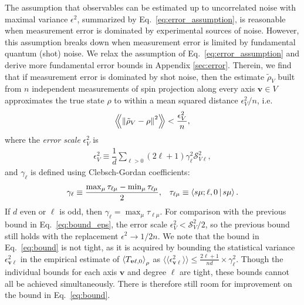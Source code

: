 \documentclass[notitlepage,twocolumn]{revtex4-2}
\newcommand{\f}[2]{\dfrac{#1}{#2}} %
\newcommand{\p}[1]{\left(#1\right)} %
\newcommand{\bk}{\Braket} %
\renewcommand{\v}{\bm} %
\newcommand{\bbk}[1]{\langle\!\langle #1 \rangle\!\rangle}
\newcommand{\Bbk}[1]
{\left\langle\!\!\left\langle #1 \right\rangle\!\!\right\rangle}
\renewcommand{\S}{\mathcal{S}}
\begin{document}
The assumption that observables can be estimated up to uncorrelated noise with maximal variance $\epsilon^2$, summarized by Eq.~\eqref{eq:error_assumption}, is reasonable when measurement error is dominated by experimental sources of noise.
However, this assumption breaks down when measurement error is limited by fundamental quantum (shot) noise.
We relax the assumption of Eq.~\eqref{eq:error_assumption} and derive more fundamental error bounds in Appendix \ref{sec:error}.
Therein, we find that if measurement error is dominated by shot noise, then the estimate $\tilde\rho_V$ built from $n$ independent measurements of spin projection along every axis $\v v\in V$ approximates the true state $\rho$ to within a mean squared distance $\epsilon_V^2/n$, i.e.
\begin{align}
  \Bbk{\norm{\tilde\rho_V-\rho}^2} < \f{\epsilon_V^2}{n},
  \label{eq:bound}
\end{align}
where the {\it error scale} $\epsilon_V^2$ is
\begin{align}
  \epsilon_V^2 \equiv
  \f1d \sum_{\ell>0} \p{2\ell+1} \gamma_\ell^2 \S_{V\ell}^2,
  \label{eq:scale}
\end{align}
and $\gamma_\ell$ is defined using Clebsch-Gordan coefficients:
\begin{align}
  \gamma_\ell
  \equiv \f{\max_\mu\tau_{\ell\mu} - \min_\mu\tau_{\ell\mu}}{2},
  &&
  \tau_{\ell\mu} \equiv \bk{s\mu;\ell,0|s\mu}.
\end{align}
If $d$ even or $\ell$ is odd, then $\gamma_\ell=\max_\mu\tau_{\ell\mu}$.
For comparison with the previous bound in Eq.~\eqref{eq:bound_eps}, the error scale $\epsilon_V^2<\S_V^2/2$, so the previous bound still holds with the replacement $\epsilon^2\to1/2n$.
We note that the bound in Eq.~\eqref{eq:bound} is not tight, as it is acquired by bounding the statistical variance $\epsilon_{\v v\ell}^2$ in the empirical estimate of $\bk{T_{\v v\ell,0}}_\rho$ as $\bbk{\epsilon_{\v v\ell}^2}\le\frac{2\ell+1}{nd}\times\gamma_\ell^2$.
Though the individual bounds for each axis $\v v$ and degree $\ell$
are tight, these bounds cannot all be achieved simultaneously.
There is therefore still room for improvement on the bound in Eq.~\eqref{eq:bound}.
\end{document}
